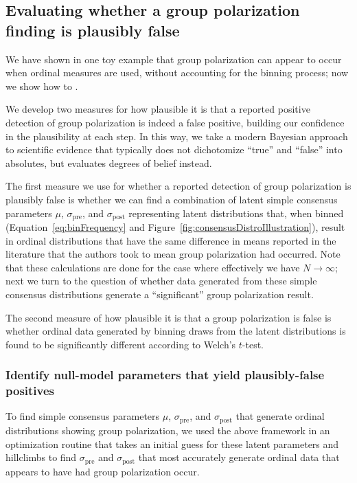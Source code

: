 \documentclass[11pt, letterpaper]{article}
\newcommand{\sigmapre}{\sigma_\mathrm{pre}}
\newcommand{\sigmapost}{\sigma_\mathrm{post}}
\begin{document}
\subsection{Evaluating whether a group polarization finding is plausibly false}

We have shown in one toy example that group polarization can appear to occur
when ordinal measures are used, without accounting for the binning process; now
we show how to .

We develop two measures for how plausible it is that a reported positive detection
of group polarization is indeed a false positive, building our confidence 
in the plausibility at each step. In this way, we take a modern Bayesian approach
to scientific evidence that typically does not dichotomize ``true'' and ``false''
into absolutes, but evaluates degrees of belief instead.

The first measure we use for whether a reported detection of group polarization
is plausibly false is whether we can find a combination of latent simple
consensus parameters $\mu$, $\sigmapre$, and $\sigmapost$ representing latent
distributions that, when binned (Equation~\ref{eq:binFrequency} and
Figure~\ref{fig:consensusDistroIllustration}), result in ordinal distributions
that have the same difference in means reported in the literature that the authors
took to mean group polarization had occurred. Note that these calculations are
done for the case where effectively we have $N \to \infty$; next we turn to
the question of whether data generated from these simple consensus distributions
generate a ``significant'' group polarization result. 

The second measure of how plausible it is that a group polarization is false
is whether ordinal data generated by binning draws from the latent distributions
is found to be significantly different according to Welch's $t$-test.


\subsubsection{Identify null-model parameters that yield plausibly-false positives}

To find simple consensus parameters $\mu$, $\sigmapre$, and $\sigmapost$ that
generate ordinal distributions showing group polarization, we used the above
framework in an optimization routine that takes an initial guess for these latent
parameters and hillclimbs to find $\sigmapre$ and $\sigmapost$ that most accurately
generate ordinal data that appears to have had group polarization occur.
\end{document}
